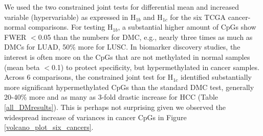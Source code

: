 \documentclass{statsoc}
\begin{document}


%
We used the two constrained joint tests for differential mean and increased variable (hypervariable) as expressed in H$_{1b}$ and H$_{1c}$ for the six TCGA cancer-normal comparisons. For testing H$_{1b}$, a substantial higher amount of CpGs show FWER $<$0.05 than the numbers for DMC, e.g., nearly three times as much as DMCs for LUAD, 50\% more for LUSC.  In biomarker discovery studies, the interest is often more on the CpGs that are not methylated in normal samples (mean beta $<$0.1) to protect specificity, but hypermethylated in cancer samples. Across 6 comparisons, the constrained joint test for  H$_{1c}$ identified substantially more significant hypermethylated CpGs than the standard DMC test, generally 20-40\% more and as many as 3-fold drastic increase for HCC (Table \ref{all_DMresults}). This is perhaps not surprising given we observed the widespread increase of variances in cancer CpGs in Figure \ref{volcano_plot_six_cancers}.
\end{document}
